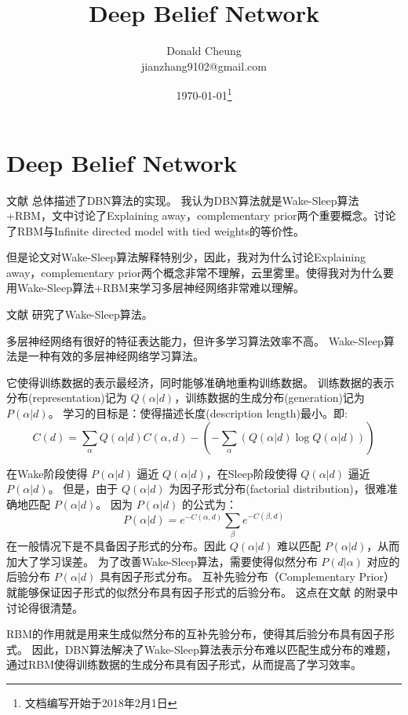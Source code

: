 \ifx\mlbook\undefined
    \providecommand{\pathroot}{../../..}

    \title{Deep Belief Network}
    \author{Donald Cheung\\jianzhang9102@gmail.com}
    \date{\today\footnote{文档编写开始于2018年2月1日}}

    
\fi

\chapter{Deep Belief Network}


文献 \cite{hinton2006fast} 总体描述了DBN算法的实现。
我认为DBN算法就是Wake-Sleep算法+RBM，文中讨论了Explaining away，complementary prior两个重要概念。讨论了RBM与Infinite directed model with tied weights的等价性。

但是论文对Wake-Sleep算法解释特别少，因此，我对为什么讨论Explaining away，complementary prior两个概念非常不理解，云里雾里。使得我对为什么要用Wake-Sleep算法+RBM来学习多层神经网络非常难以理解。


文献 \cite{hinton1995wake} 研究了Wake-Sleep算法。

多层神经网络有很好的特征表达能力，但许多学习算法效率不高。
Wake-Sleep算法是一种有效的多层神经网络学习算法。

它使得训练数据的表示最经济，同时能够准确地重构训练数据。
训练数据的表示分布(representation)记为 $Q(\alpha | d)$，训练数据的生成分布(generation)记为 $P(\alpha|d)$。
学习的目标是：使得描述长度(description length)最小。即:
\[
    C(d) = \sum_{\alpha} Q(\alpha | d) C(\alpha, d) − (−\sum_{\alpha}(Q(\alpha | d) \log Q(\alpha | d)))
\]

在Wake阶段使得 $P(\alpha|d)$ 逼近 $Q(\alpha|d)$，在Sleep阶段使得 $Q(\alpha | d)$ 逼近 $P(\alpha | d)$。
但是，由于 $Q(\alpha | d)$ 为因子形式分布(factorial distribution)，很难准确地匹配 $P(\alpha | d)$。
因为 $P(\alpha | d)$ 的公式为：
\[
    P(\alpha | d) = e^{−C(\alpha,d)} \sum_{\beta} e^{−C(\beta,d)}
\]
在一般情况下是不具备因子形式的分布。因此 $Q(\alpha | d)$ 难以匹配 $P(\alpha | d)$，从而加大了学习误差。
为了改善Wake-Sleep算法，需要使得似然分布 $P(d | \alpha)$ 对应的后验分布 $P(\alpha | d)$ 具有因子形式分布。
互补先验分布（Complementary Prior）就能够保证因子形式的似然分布具有因子形式的后验分布。
这点在文献 \cite{hinton2006fast} 的附录中讨论得很清楚。

RBM的作用就是用来生成似然分布的互补先验分布，使得其后验分布具有因子形式。
因此，DBN算法解决了Wake-Sleep算法表示分布难以匹配生成分布的难题，通过RBM使得训练数据的生成分布具有因子形式，从而提高了学习效率。



